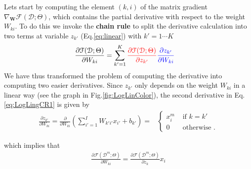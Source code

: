 
Lets start by computing the element $(k,i)$ of the matrix gradient
$\nabla_\mathbf{W}\mathcal{F}(\mathcal{D};\Theta)$, which contains the partial
derivative with respect to the weight $W_{ki}$. To do this we invoke the \textbf{chain rule} to split the derivative calculation into two terms at variable $z_{k'}$ (Eq.\ref{eq:linear}) with $k'=1\cdots K$
%
\begin{align}
\frac{\partial \mathcal{F}(\mathcal{D};\Theta)}{\partial W_{ki}} & = \sum_{k'=1}^{K} { \color{red} \frac{\partial \mathcal{F}(\mathcal{D};\Theta)}{\partial z_{k'}} }{ \color{blue} \frac{\partial z_{k'}}{\partial W_{ki}}}
\label{eq:LogLingCR1}
\end{align}
%
We have thus transformed the problem of computing the derivative into computing two easier derivatives. Since $z_{k'}$ only depends on the weight $W_{ki}$ in a linear way (see the graph in Fig.\ref{fig:LogLinColor}), the second derivative in Eq.\ref{eq:LogLingCR1} is given by
\begin{align}
\frac{\partial z_{k'}}{\partial W_{ki}} = \frac{\partial }{\partial W_{ki}}\left(\sum_{i'=1}^{I} W_{k'i'} x_{i'} + b_{k'} \right) = 
  &\begin{cases}
      x_i^m  &  \mbox{ if } k = k'\\ 
      0    &  \mbox{ otherwise }.
  \end{cases}
  \label{eq:partialLinear}
\end{align}

\noindent which implies that 
%
\begin{align}
\frac{\partial \mathcal{F}(\mathcal{D}^m;\Theta)}{\partial W_{ki}} = \frac{\partial \mathcal{F}(\mathcal{D}^m;\Theta) }{\partial z_k} x_i
\label{eq:gradlogPycx}
\end{align}
%

